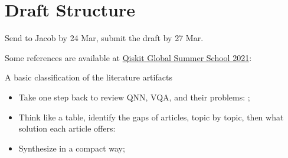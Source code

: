 \section{Draft Structure}
Send to Jacob by 24 Mar, submit the draft by 27 Mar.

Some references are available at \href{https://www.youtube.com/watch?v=0ENQXz9tDww&list=PLOFEBzvs-VvqJwybFxkTiDzhf5E11p8BI&index=18}{Qiskit Global Summer School 2021}: 
\cite{mccleanBarrenPlateausQuantum2018, cerezoCostFunctionDependent2021, romeroQuantumAutoencodersEfficient2017, beerTrainingDeepQuantum2020, sharmaTrainabilityDissipativePerceptronbased2020, grantHierarchicalQuantumClassifiers2018, congQuantumConvolutionalNeural2019, pesahAbsenceBarrenPlateaus2021, wangNoiseinducedBarrenPlateaus2021, skolikLayerwiseLearningQuantum2021, grantInitializationStrategyAddressing2019,holmesConnectingAnsatzExpressibility2022,volkoffLargeGradientsCorrelation2021, marreroEntanglementinducedBarrenPlateaus2021, pattiEntanglementDevisedBarren2021, verdonLearningLearnQuantum2019, carolanVariationalQuantumUnsampling2020, manginiQuantumComputingModels2021}

A basic classification of the literature artifacts
\begin{itemize}
    \item Take one step back to review QNN, VQA, and their problems: \cite{mccleanBarrenPlateausQuantum2018, cerezo2021variational};
    \item Think like a table, identify the gaps of articles, topic by topic, then what solution each article offers: \cite{skolikLayerwiseLearningQuantum2021, grantInitializationStrategyAddressing2019, cerezoCostFunctionDependent2021}
    \item Synthesize in a compact way;
\end{itemize}